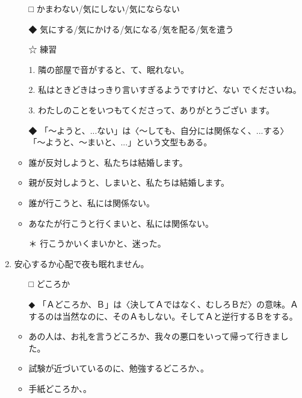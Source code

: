 \documentclass[
uplatex,
b5paper,
10pt,
dvipdfmx
]{jsbook}
\begin{document}
\begin{enumerate}
\begin{itemize}
\item[□] かまわない/気にしない/気にならない
\item[◆] 気にする/気にかける/気になる/気を配る/気を遣う
\end{itemize}
\begin{itemize}
\item[☆] 練習
\end{itemize}
\begin{itemize}
\item[1.] 隣の部屋で音がすると、\underline{\hspace{3zw}}て、眠れない。
\item[2.] 私はときどきはっきり言いすぎるようですけど、\underline{\hspace{3zw}}ない
	  でくださいね。
\item[3.] わたしのことをいつも\underline{\hspace{3zw}}てくださって、ありがとうござい
	  ます。
\end{itemize}
\begin{itemize}
\item[◆] 「〜ようと、...ない」は〈〜しても、自分には関係なく、...する〉
	  「〜ようと、〜まいと、...」という文型もある。
\end{itemize}

\begin{itemize}
\item 誰が反対しようと、私たちは結婚します。 
\item 親が反対しようと、しまいと、私たちは結婚します。 
\item 誰が行こうと、私には関係ない。 
\item あなたが行こうと行くまいと、私には関係ない。 
\item[＊] 行こうかいくまいかと、迷った。
\end{itemize}

\item 安心する\underline{\hspace{3zw}}か心配で夜も眠れません。
\begin{itemize}
\item[□] どころか
\item[◆] 「Ａどころか、Ｂ」は〈決してＡではなく、むしろＢだ〉の意味。Ａ
	  するのは当然なのに、そのＡもしない。そしてＡと逆行するＢをする。
\end{itemize}
\begin{itemize}
 \item あの人は、お礼を言うどころか、我々の悪口をいって帰って行きました。 
 \item 試験が近づいているのに、勉強するどころか、\underline{\hspace{3zw}}。
 \item 手紙どころか、\underline{\hspace{3zw}}。
\end{itemize}


\end{enumerate}
\end{document}
